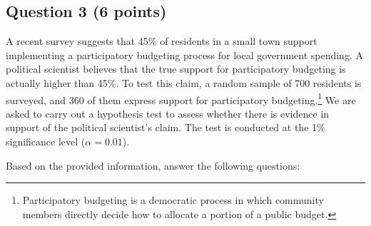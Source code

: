 \documentclass{article}
\begin{document}
\newpage
\subsection*{Question 3 (6 points)}

A recent survey suggests that 45\% of residents in a small town support implementing a participatory budgeting process for local government spending. A political scientist believes that the true support for participatory budgeting is actually higher than 45\%. To test this claim, a random sample of 700 residents is surveyed, and 360 of them express support for participatory budgeting.\footnote{Participatory budgeting is a democratic process in which community members directly decide how to allocate a portion of a public budget.} We are asked to carry out a hypothesis test to assess whether there is evidence in support of the political scientist's claim. The test is conducted at the 1\% significance level ($\alpha=0.01$).

Based on the provided information, answer the following questions:
\end{document}
